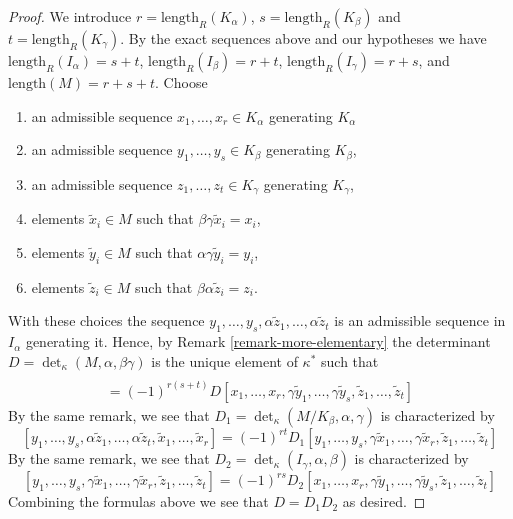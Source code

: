 \documentclass[10pt,a4paper]{amsart}
\theoremstyle{plain}
\theoremstyle{definition}
\theoremstyle{remark}
\numberwithin{equation}{subsection}
\begin{document}
\begin{proof}
\medskip\noindent
We introduce $r = \text{length}_R(K_\alpha)$,
$s = \text{length}_R(K_\beta)$ and $t = \text{length}_R(K_\gamma)$.
By the exact sequences above and our hypotheses we have
$\text{length}_R(I_\alpha) = s + t$, $\text{length}_R(I_\beta) = r + t$,
$\text{length}_R(I_\gamma) = r + s$, and
$\text{length}(M) = r + s + t$.
Choose
\begin{enumerate}
\item an admissible sequence $x_1, \ldots, x_r \in K_\alpha$
generating $K_\alpha$
\item an admissible sequence $y_1, \ldots, y_s \in K_\beta$
generating $K_\beta$,
\item an admissible sequence $z_1, \ldots, z_t \in K_\gamma$
generating $K_\gamma$,
\item elements $\tilde x_i \in M$ such that $\beta\gamma\tilde x_i = x_i$,
\item elements $\tilde y_i \in M$ such that $\alpha\gamma\tilde y_i = y_i$,
\item elements $\tilde z_i \in M$ such that $\beta\alpha\tilde z_i = z_i$.
\end{enumerate}
With these choices the sequence
$y_1, \ldots, y_s, \alpha\tilde z_1, \ldots, \alpha\tilde z_t$
is an admissible sequence in $I_\alpha$ generating it.
Hence, by Remark \ref{remark-more-elementary} the determinant
$D = \det_\kappa(M, \alpha, \beta\gamma)$ is the
unique element of $\kappa^*$ such that
\begin{align*}
[y_1, \ldots, y_s,
\alpha\tilde z_1, \ldots, \alpha\tilde z_s,
\tilde x_1, \ldots, \tilde x_r] \\
= (-1)^{r(s + t)} D
[x_1, \ldots, x_r,
\gamma\tilde y_1, \ldots, \gamma\tilde y_s,
\tilde z_1, \ldots, \tilde z_t]
\end{align*}
By the same remark, we see that
$D_1 = \det_\kappa(M/K_\beta, \alpha, \gamma)$
is characterized by
$$
[y_1, \ldots, y_s,
\alpha\tilde z_1, \ldots, \alpha\tilde z_t,
\tilde x_1, \ldots, \tilde x_r]
=
(-1)^{rt} D_1
[y_1, \ldots, y_s,
\gamma\tilde x_1, \ldots, \gamma\tilde x_r,
\tilde z_1, \ldots, \tilde z_t]
$$
By the same remark, we see that
$D_2 = \det_\kappa(I_\gamma, \alpha, \beta)$ is characterized by
$$
[y_1, \ldots, y_s,
\gamma\tilde x_1, \ldots, \gamma\tilde x_r,
\tilde z_1, \ldots, \tilde z_t]
=
(-1)^{rs} D_2
[x_1, \ldots, x_r,
\gamma\tilde y_1, \ldots, \gamma\tilde y_s,
\tilde z_1, \ldots, \tilde z_t]
$$
Combining the formulas above we see that $D = D_1 D_2$
as desired.
\end{proof}
\end{document}
